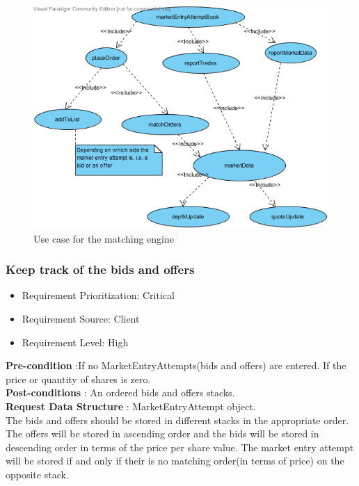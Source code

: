 \documentclass[12pt]{article}
\begin{document}
						\begin{figure}[th]
						\centering
						\includegraphics[scale=0.8]{matching_engine_use_case}
						\caption{Use case for the matching engine}
						\label{matching engine use case}
						\end{figure}
				\pagebreak
				
				\subsubsection{Keep track of the bids and offers}
						\begin{itemize}
							\item Requirement Prioritization: Critical
							\item Requirement Source: Client 
							\item Requirement Level: High	
						\end{itemize}
						
						\textbf{Pre-condition} :If no MarketEntryAttempts(bids and offers) are entered.
						If the price or quantity of shares is zero.\\ 
						\textbf{Post-conditions} : An ordered bids and offers stacks.\\ 
						\textbf{Request Data Structure} : MarketEntryAttempt object.\\
						
						The bids and offers should be stored in different stacks in the appropriate order. The offers will be stored in ascending order and the  bids will be stored in descending order in terms of the price per share value. The market entry attempt will be stored if and only if their is no matching order(in terms of price) on the opposite stack.\\
						
\end{document}
